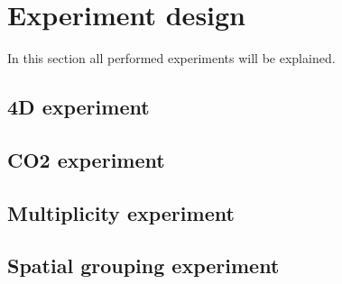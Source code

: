 \section{Experiment design}
In this section all performed experiments will be explained. 

\subsection{4D experiment}

\subsection{CO2 experiment}

\subsection{Multiplicity experiment}

\subsection{Spatial grouping experiment}








